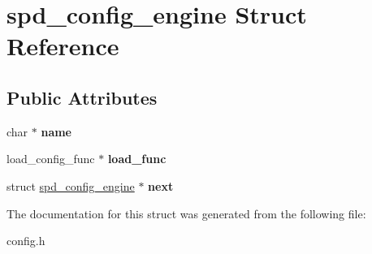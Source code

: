 \hypertarget{structspd__config__engine}{
\section{spd\_\-config\_\-engine Struct Reference}
\label{structspd__config__engine}
}
\subsection*{Public Attributes}
\begin{DoxyCompactItemize}
\item 
\hypertarget{structspd__config__engine_a2a7f6c45abd59a2bb184eb1b5cb7cd98}{
char $\ast$ {\bfseries name}}
\label{structspd__config__engine_a2a7f6c45abd59a2bb184eb1b5cb7cd98}

\item 
\hypertarget{structspd__config__engine_ace585f353f84884ea0059fa6cda7ac86}{
load\_\-config\_\-func $\ast$ {\bfseries load\_\-func}}
\label{structspd__config__engine_ace585f353f84884ea0059fa6cda7ac86}

\item 
\hypertarget{structspd__config__engine_a237c7afdf5b9c014a8fb3ed4d4b282c5}{
struct \hyperlink{structspd__config__engine}{spd\_\-config\_\-engine} $\ast$ {\bfseries next}}
\label{structspd__config__engine_a237c7afdf5b9c014a8fb3ed4d4b282c5}

\end{DoxyCompactItemize}


The documentation for this struct was generated from the following file:\begin{DoxyCompactItemize}
\item 
config.h\end{DoxyCompactItemize}

